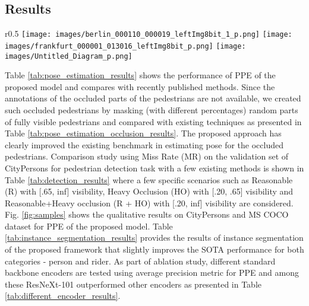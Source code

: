 \documentclass[a4paper,11pt]{article}
\begin{document}
\subsection{Results}
\begin{wrapfigure}{r}{0.5\linewidth}
    \vspace{-3mm}
    \centering
    \texttt{[image: images/berlin\_000110\_000019\_leftImg8bit\_1\_p.png]}
    \texttt{[image: images/frankfurt\_000001\_013016\_leftImg8bit\_p.png]}
    \texttt{[image: images/Untitled\_Diagram\_p.png]}
    \vspace{-3mm}
    \caption{
    \textbf{Sample outputs of the pose estimation.}
    }
    \label{fig:samples}
    \vspace{-3mm}
\end{wrapfigure}

Table \ref{tab:pose_estimation_results} shows the performance of PPE of the proposed model and compares with recently published methods. Since the annotations of the occluded parts of the pedestrians are not available, we created such occluded pedestrians by masking (with different percentages) random parts of fully visible pedestrians \cite{das2020end} and compared with existing techniques as presented in Table \ref{tab:pose_estimation_occlusion_results}. The proposed approach has clearly improved the existing benchmark in estimating pose for the occluded pedestrians. Comparison study using Miss Rate (MR) on the  validation set of CityPersons for pedestrian detection task with a few existing methods is shown in Table \ref{tab:detection_results} where a few specific scenarios such as Reasonable (R) with [.65, inf] visibility, Heavy Occlusion (HO) with [.20, .65] visibility and Reasonable+Heavy occlusion (R + HO) with [.20, inf] visibility are considered. Fig. \ref{fig:samples} shows the qualitative results on CityPersons and MS COCO dataset for PPE of the proposed model. Table \ref{tab:instance_segmentation_results} provides the results of instance segmentation of the proposed framework that slightly improves the SOTA performance for both categories - person and rider. As part of ablation study, different standard backbone encoders are tested using average precision metric for PPE and among these ResNeXt-101 outperformed other encoders as presented in Table \ref{tab:different_encoder_results}.
\end{document}
